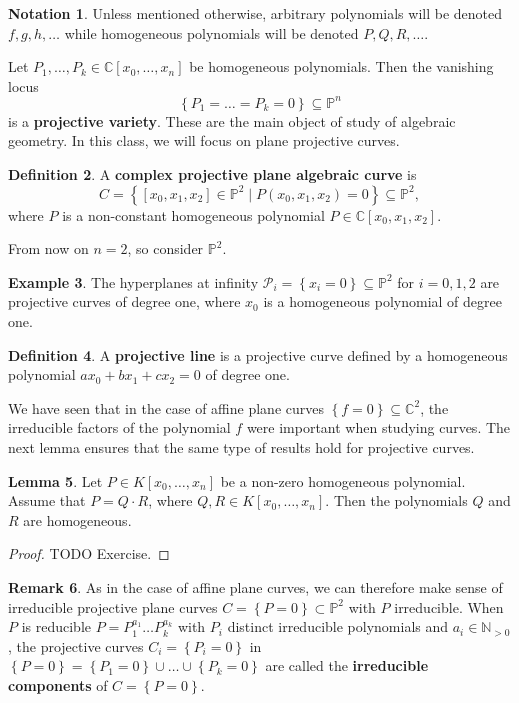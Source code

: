 \documentclass{article}
\newcommand{\N}{\mathbb{N}}
\newcommand{\C}{\mathbb{C}}
\renewcommand{\P}{\mathbb{P}}
\newcommand{\rb}[1]{\left( #1 \right)}
\renewcommand{\sb}[1]{\left[ #1 \right]}
\newcommand{\cb}[1]{\left\{ #1 \right\}}
\theoremstyle{definition}\newtheorem{definition}{Definition}[section]
\theoremstyle{definition}\newtheorem{notation}[definition]{Notation}
\theoremstyle{definition}\newtheorem{remark}[definition]{Remark}
\theoremstyle{definition}\newtheorem{example}[definition]{Example}
\theoremstyle{definition}\newtheorem{fact}{Fact}
\theoremstyle{definition}\newtheorem{exercise}{Exercise}
\newtheorem{lemma}[definition]{Lemma}
\begin{document}
\begin{notation}
Unless mentioned otherwise, arbitrary polynomials will be denoted $ f, g, h, \dots $ while homogeneous polynomials will be denoted $ P, Q, R, \dots $.
\end{notation}

Let $ P_1, \dots, P_k \in \C\sb{x_0, \dots, x_n} $ be homogeneous polynomials. Then the vanishing locus
$$ \cb{P_1 = \dots = P_k = 0} \subseteq \P^n $$
is a \textbf{projective variety}. These are the main object of study of algebraic geometry. In this class, we will focus on plane projective curves.

\begin{definition}
A \textbf{complex projective plane algebraic curve} is
$$ C = \cb{\sb{x_0, x_1, x_2} \in \P^2 \mid P\rb{x_0, x_1, x_2} = 0} \subseteq \P^2, $$
where $ P $ is a non-constant homogeneous polynomial $ P \in \C\sb{x_0, x_1, x_2} $.
\end{definition}

From now on $ n = 2 $, so consider $ \P^2 $.

\begin{example}
The hyperplanes at infinity $ \mathcal{P}_i = \cb{x_i = 0} \subseteq \P^2 $ for $ i = 0, 1, 2 $ are projective curves of degree one, where $ x_0 $ is a homogeneous polynomial of degree one.
\end{example}

\begin{definition}
A \textbf{projective line} is a projective curve defined by a homogeneous polynomial $ ax_0 + bx_1 + cx_2 = 0 $ of degree one.
\end{definition}

We have seen that in the case of affine plane curves $ \cb{f = 0} \subseteq \C^2 $, the irreducible factors of the polynomial $ f $ were important when studying curves. The next lemma ensures that the same type of results hold for projective curves.

\begin{lemma}
Let $ P \in K\sb{x_0, \dots, x_n} $ be a non-zero homogeneous polynomial. Assume that $ P = Q \cdot R $, where $ Q, R \in K\sb{x_0, \dots, x_n} $. Then the polynomials $ Q $ and $ R $ are homogeneous.
\end{lemma}

\begin{proof}
TODO Exercise.
\end{proof}

\begin{remark}
As in the case of affine plane curves, we can therefore make sense of irreducible projective plane curves $ C = \cb{P = 0} \subset \P^2 $ with $ P $ irreducible. When $ P $ is reducible $ P = P_1^{a_1} \dots P_k^{a_k} $ with $ P_i $ distinct irreducible polynomials and $ a_i \in \N_{> 0} $, the projective curves $ C_i = \cb{P_i = 0} $ in $ \cb{P = 0} = \cb{P_1 = 0} \cup \dots \cup \cb{P_k = 0} $ are called the \textbf{irreducible components} of $ C = \cb{P = 0} $.
\end{remark}
\end{document}
